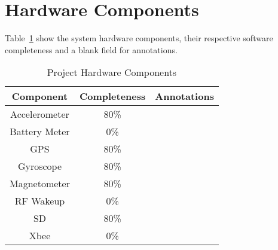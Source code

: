 \section{Hardware Components}
Table~\ref{tab:hwComp} show the system hardware components, their respective software completeness and a blank field for annotations.


    \begin{table}[H]
    \centering
    \caption{Project Hardware Components}
    \begin{tabular}{|c|c|c|}
    \hline
    \rowcolor{Gray}
    Component & Completeness & Annotations \\ 
    \hline \hline   
        Accelerometer & 80\%  &  \\ \hline
        Battery Meter & 0\%   &  \\ \hline
        GPS   & 80\%   &  \\ \hline
        Gyroscope & 80\%   &  \\ \hline
        Magnetometer & 80\%   &  \\ \hline
        RF Wakeup & 0\%   &  \\ \hline
        SD & 80\%  &  \\ \hline
        Xbee  & 0\%   &  \\ \hline
        \end{tabular}%
    \label{tab:hwComp}%
    \end{table}

